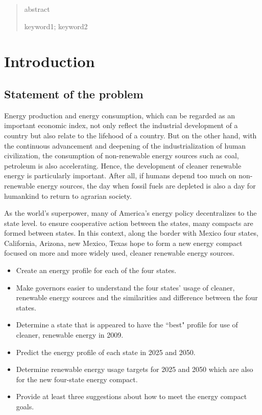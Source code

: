 \documentclass{mcmthesis}
\title{}
\newcommand{\rmnum}[1]{\romannumeral #1}
\begin{document}
\begin{abstract}
abstract
\begin{keywords}
keyword1; keyword2
\end{keywords}
\end{abstract}
\maketitle


\tableofcontents
\pagestyle{fancy} 
\rhead{\small\sffamily  \rmnum{\thepage}}
\newpage
\pagestyle{fancy}
\setcounter{page}{1}

\section{Introduction}
\subsection{Statement of the problem}
Energy production and energy consumption, which can be regarded as an important economic index, not only reflect the industrial development of a country but also relate to the lifehood of a country. But on the other hand, with the continuous advancement and deepening of the industrialization of human civilization, the consumption of non-renewable energy sources such as coal, petroleum is also accelerating. Hence, the development of cleaner renewable energy is particularly important. After all, if humans depend too much on non-renewable energy sources, the day when fossil fuels are depleted is also a day for humankind to return to agrarian society.

As the world's superpower, many of America's energy policy decentralizes to the state level. to ensure cooperative action between the states\cite{州际契约}, many compacts are formed between states. In this context, along the border with Mexico four states, California, Arizona, new Mexico, Texas hope to form a new energy compact focused on more and more widely used, cleaner renewable energy sources.
\begin{itemize}
  \item Create an energy profile for each of the four states.
  \item Make governors easier to understand the four states’ usage of cleaner, renewable energy sources  and the similarities and difference between the four states.
  \item Determine a state that is appeared to have the ``best" profile for use of cleaner, renewable energy in 2009.
  \item Predict the energy profile of each state in 2025 and 2050.
  \item Determine renewable energy usage targets for 2025 and 2050 which are also for the new four-state energy compact.
  \item Provide at least three suggestions about how to meet the energy compact goals.
\end{itemize}
\end{document}
